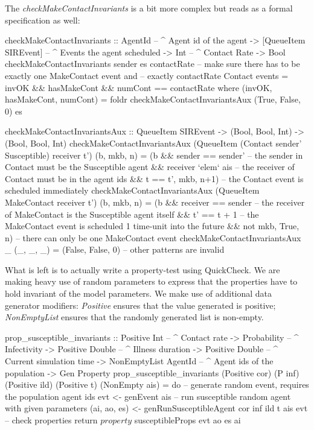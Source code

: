 The \textit{checkMakeContactInvariants} is a bit more complex but reads as a formal specification as well:

\begin{HaskellCode}
checkMakeContactInvariants :: AgentId              -- ^ Agent id of the agent 
                           -> [QueueItem SIREvent] -- ^ Events the agent scheduled
                           -> Int                  -- ^ Contact Rate
                           -> Bool
checkMakeContactInvariants sender es contactRate
    -- make sure there has to be exactly one MakeContact event and
    -- exactly contactRate Contact events
    = invOK && hasMakeCont && numCont == contactRate
  where
    (invOK, hasMakeCont, numCont) 
      = foldr checkMakeContactInvariantsAux (True, False, 0) es

    checkMakeContactInvariantsAux :: QueueItem SIREvent 
                                  -> (Bool, Bool, Int)
                                  -> (Bool, Bool, Int)
    checkMakeContactInvariantsAux 
        (QueueItem (Contact sender' Susceptible) receiver t') (b, mkb, n)
      = (b && sender == sender'    -- the sender in Contact must be the Susceptible agent
           && receiver `elem` ais  -- the receiver of Contact must be in the agent ids
           && t == t', mkb, n+1)   -- the Contact event is scheduled immediately
    checkMakeContactInvariantsAux 
        (QueueItem MakeContact receiver t') (b, mkb, n) 
      = (b && receiver == sender   -- the receiver of MakeContact is the Susceptible agent itself
           && t' == t + 1          -- the MakeContact event is scheduled 1 time-unit into the future
           &&  not mkb, True, n)   -- there can only be one MakeContact event
    checkMakeContactInvariantsAux _ (_, _, _) 
      = (False, False, 0)          -- other patterns are invalid
\end{HaskellCode}

What is left is to actually write a property-test using QuickCheck. We are making heavy use of random parameters to express that the properties have to hold invariant of the model parameters. We make use of additional data generator modifiers: \textit{Positive} ensures that the value generated is positive; \textit{NonEmptyList} ensures that the randomly generated list is non-empty.

\begin{HaskellCode}
prop_susceptible_invariants :: Positive Int         -- ^ Contact rate
                            -> Probability          -- ^ Infectivity
                            -> Positive Double      -- ^ Illness duration
                            -> Positive Double      -- ^ Current simulation time
                            -> NonEmptyList AgentId -- ^ Agent ids of the population
                            -> Gen Property
prop_susceptible_invariants 
  (Positive cor) (P inf) (Positive ild) (Positive t) (NonEmpty ais) = do
  -- generate random event, requires the population agent ids
  evt <- genEvent ais
  -- run susceptible random agent with given parameters
  (ai, ao, es) <- genRunSusceptibleAgent cor inf ild t ais evt
  -- check properties
  return $ property $ susceptibleProps evt ao es ai
\end{HaskellCode}

